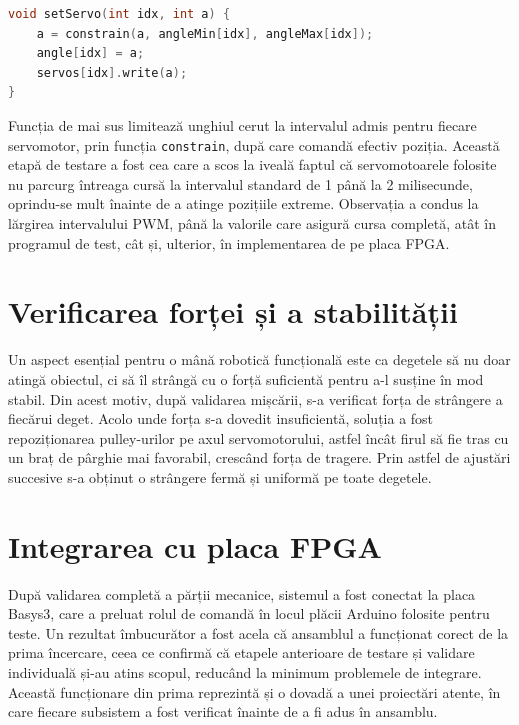 \begin{lstlisting}[language=C++,caption={Fragment din programul de test, comanda unui servomotor cu limitare la interval.},label={lst:arduino}]
void setServo(int idx, int a) {
    a = constrain(a, angleMin[idx], angleMax[idx]);
    angle[idx] = a;
    servos[idx].write(a);
}
\end{lstlisting}

Funcția de mai sus limitează unghiul cerut la intervalul admis pentru fiecare servomotor,
prin funcția \texttt{constrain}, după care comandă efectiv poziția. Această etapă de
testare a fost cea care a scos la iveală faptul că servomotoarele folosite nu parcurg
întreaga cursă la intervalul standard de 1 până la 2 milisecunde, oprindu-se mult înainte
de a atinge pozițiile extreme. Observația a condus la lărgirea intervalului PWM, până la
valorile care asigură cursa completă, atât în programul de test, cât și, ulterior, în
implementarea de pe placa FPGA.

\section{Verificarea forței și a stabilității}
\label{sec:testare-forta}

Un aspect esențial pentru o mână robotică funcțională este ca degetele să nu doar atingă
obiectul, ci să îl strângă cu o forță suficientă pentru a-l susține în mod stabil. Din
acest motiv, după validarea mișcării, s-a verificat forța de strângere a fiecărui deget.
Acolo unde forța s-a dovedit insuficientă, soluția a fost repoziționarea pulley-urilor pe
axul servomotorului, astfel încât firul să fie tras cu un braț de pârghie mai favorabil,
crescând forța de tragere. Prin astfel de ajustări succesive s-a obținut o strângere
fermă și uniformă pe toate degetele.

\section{Integrarea cu placa FPGA}
\label{sec:testare-integrare}

După validarea completă a părții mecanice, sistemul a fost conectat la placa Basys3, care
a preluat rolul de comandă în locul plăcii Arduino folosite pentru teste. Un rezultat
îmbucurător a fost acela că ansamblul a funcționat corect de la prima încercare, ceea ce
confirmă că etapele anterioare de testare și validare individuală și-au atins scopul,
reducând la minimum problemele de integrare. Această funcționare din prima reprezintă și o
dovadă a unei proiectări atente, în care fiecare subsistem a fost verificat înainte de a fi
adus în ansamblu.

